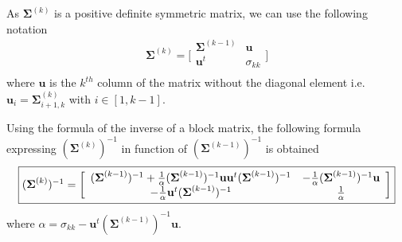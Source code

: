 \documentclass[a4paper,11pt,DIV=16]{scrartcl}
\begin{document}
        As $\boldsymbol{\Sigma}^{(k)}$ is a positive definite symmetric matrix, we can use the following notation
        \begin{equation*}
            \boldsymbol{\Sigma}^{(k)} =
            \bigg[\begin{array}{cc}
            \boldsymbol{\Sigma}^{(k-1)} & \mathbf{u}      \\
            \mathbf{u}^t          & \sigma_{kk} \\
            \end{array}\bigg]
        \end{equation*}
        where $\mathbf{u}$ is the $k^{th}$ column of the matrix without the diagonal element i.e. $\mathbf{u}_{i} = \boldsymbol{\Sigma}^{(k)}_{i+1,k}$ with $i \in [1,k-1]$.

        Using the formula of the inverse of a block matrix, the following formula expressing $(\boldsymbol{\Sigma}^{(k)})^{-1}$ in function of $(\boldsymbol{\Sigma}^{(k-1)})^{-1}$ is obtained
        \begin{equation}
            \fbox{$
            (\boldsymbol{\Sigma}^{(k)})^{-1} =
            \bigg[\begin{array}{cc}
            (\boldsymbol{\Sigma}^{(k-1)})^{-1} + \frac{1}{\alpha} (\boldsymbol{\Sigma}^{(k-1)})^{-1} \mathbf{u} \mathbf{u}^t (\boldsymbol{\Sigma}^{(k-1)})^{-1} & - \frac{1}{\alpha} (\boldsymbol{\Sigma}^{(k-1)})^{-1} \mathbf{u} \\
            - \frac{1}{\alpha} \mathbf{u}^t (\boldsymbol{\Sigma}^{(k-1)})^{-1}                                                                          & \frac{1}{\alpha}                  \\
            \end{array}\bigg]
            $}
        \end{equation}
        where $ \alpha = \sigma_{kk} - \mathbf{u}^t (\boldsymbol{\Sigma}^{(k-1)})^{-1} \mathbf{u} $.
\end{document}
